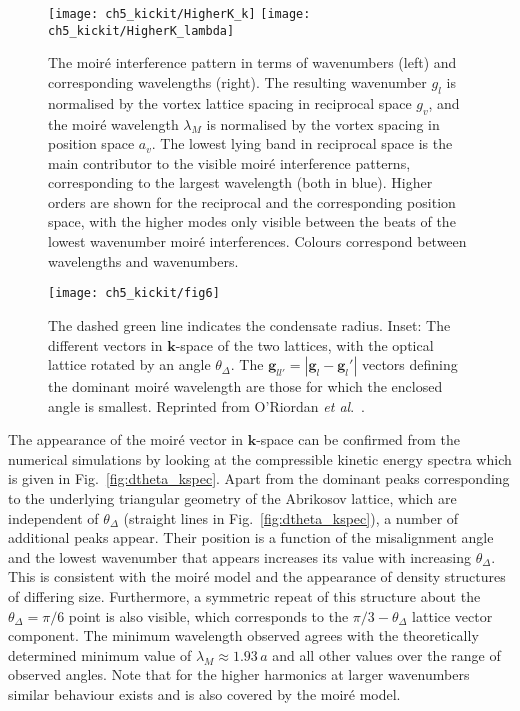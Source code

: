 \begin{figure}
    \centering
    \texttt{[image: ch5\_kickit/HigherK\_k]}
    \texttt{[image: ch5\_kickit/HigherK\_lambda]}
    \caption[The moir\'e interference pattern in terms of wavenumbers.]{The moir\'e interference pattern in terms of wavenumbers (left) and corresponding wavelengths (right). The resulting wavenumber $g_l$ is normalised by the vortex lattice spacing in reciprocal space $g_v$, and the moir\'e wavelength $\lambda_M$ is normalised by the vortex spacing in position space $a_v$. The lowest lying band in reciprocal space is the main contributor to the visible moir\'e interference patterns, corresponding to the largest wavelength (both in blue). Higher orders are shown for the reciprocal and the corresponding position space, with the higher modes only visible between the beats of the lowest wavenumber moir\'e interferences. Colours correspond between wavelengths and wavenumbers.}\label{fig:moire_higher}
\end{figure}

\begin{figure}
    \centering
	\texttt{[image: ch5\_kickit/fig6]}
	\caption[Size of the resulting moir\'e super-structures as a function of the relative angle between the vortex and optical lattice.]{The dashed green line indicates the condensate radius. Inset: The different vectors in $\mathbf{k}$-space of the two lattices, with the optical lattice rotated by an angle $\theta_\Delta$. The $\mathbf{g}_{ll'} = |\mathbf{g}_l - \mathbf{g}_l'|$ vectors defining the dominant moir\'e wavelength are those for which the enclosed angle is smallest. Reprinted from O'Riordan {\textit{et al}.}~\cite{VTX:oriordan_pra_2016}.}
	\label{fig:moire_lambda_1}
\end{figure}

    The appearance of the moir\'e vector in $\mathbf{k}$-space can be confirmed from the numerical simulations by looking at the compressible kinetic energy spectra which is given in Fig.~\ref{fig:dtheta_kspec}. Apart from the dominant peaks corresponding to the underlying triangular geometry of the Abrikosov lattice, which are independent of $\theta_\Delta$ (straight lines in Fig.~\ref{fig:dtheta_kspec}), a number of additional peaks appear. Their position is a function of the misalignment angle and the lowest wavenumber that appears increases its value with increasing $\theta_\Delta$. This is consistent with the moir\'e model and the appearance of density structures of differing size. Furthermore, a symmetric repeat of this structure about the $\theta_\Delta=\pi/6$ point is also visible, which corresponds to the $\pi/3 - \theta_\Delta$ lattice vector component. The minimum wavelength observed agrees with the theoretically determined minimum value of $\lambda_M\approx 1.93\,a$ and all other values over the range of observed angles. Note that for the higher harmonics at larger wavenumbers similar behaviour exists and is also covered by the moir\'e model.

